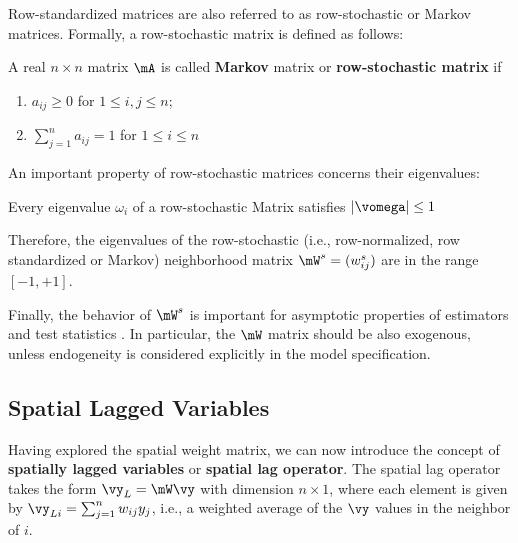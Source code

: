Row-standardized matrices are also referred to as row-stochastic or Markov matrices. Formally, a row-stochastic matrix is defined as follows:
\begin{definition}
	A real $n\times n$ matrix $\mA$ is called \textbf{Markov} matrix or \textbf{row-stochastic matrix} if 
		\begin{enumerate}
			\item $a_{ij} \geq 0$ for $1\leq i, j \leq n$;
			\item $\sum_{j=1}^n a_{ij} = 1$ for $1\leq i \leq n$
		\end{enumerate}
\end{definition}

An important property of row-stochastic matrices concerns their eigenvalues:

\begin{theorem}\label{teo:eigen_values}
	Every eigenvalue $\omega_i$ of a row-stochastic Matrix satisfies $\left|\vomega\right|\leq 1$
\end{theorem}

Therefore, the eigenvalues of the row-stochastic (i.e., row-normalized, row standardized or Markov) neighborhood matrix $\mW^s=(w_{ij}^s)$ are in the range $\left[-1, +1\right]$.

Finally, the behavior of $\mW^s$ is important for asymptotic properties of estimators and test statistics \citep[][pp. 244]{AnselinBera1998}. In particular, the $\mW$ matrix should be also exogenous, unless endogeneity is considered explicitly in the model specification. 

\subsection{Spatial Lagged Variables}\label{sec:spatial_lag_var}

Having explored the spatial weight matrix, we can now introduce the concept of  \textbf{spatially lagged variables} or \textbf{spatial lag operator}. The spatial lag operator takes the form $\vy_L = \mW\vy$ with dimension $n \times 1$, where each element is given by $\vy_{Li} = \sum_{j = 1}^nw_{ij}y_j$, i.e., a weighted average of the $\vy$ values in the neighbor of $i$.

